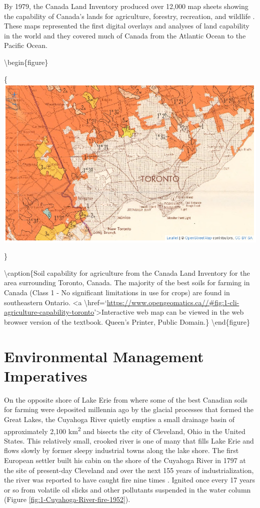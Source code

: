 \documentclass[
]{book}
\begin{document}
By 1979, the Canada Land Inventory produced over 12,000 map sheets showing the capability of Canada's lands for agriculture, forestry, recreation, and wildlife \citep{fisher_overview_1979}. These maps represented the first digital overlays and analyses of land capability in the world and they covered much of Canada from the Atlantic Ocean to the Pacific Ocean.

\textbackslash begin\{figure\}

\{\centering \includegraphics[width=1\linewidth]{images/01-cli-agriculture-capability-toronto}

\}

\textbackslash caption\{Soil capability for agriculture from the Canada Land Inventory for the area surrounding Toronto, Canada. The majority of the best soils for farming in Canada (Class 1 - No significant limitations in use for crops) are found in southeastern Ontario. \textless a
\textbackslash href=`\url{https://www.opengeomatics.ca//\#fig:1-cli-agriculture-capability-toronto}'\textgreater Interactive web map can be viewed in the web browser version of the textbook. Queen's Printer, Public Domain.\}\label{fig:1-cli-agriculture-capability-toronto}
\textbackslash end\{figure\}

\section{Environmental Management Imperatives}\label{environmental-management-imperatives}

On the opposite shore of Lake Erie from where some of the best Canadian soils for farming were deposited millennia ago by the glacial processes that formed the Great Lakes, the Cuyahoga River quietly empties a small drainage basin of approximately 2,100 km\textsuperscript{2} and bisects the city of Cleveland, Ohio in the United States. This relatively small, crooked river is one of many that fills Lake Erie and flows slowly by former sleepy industrial towns along the lake shore. The first European settler built his cabin on the shore of the Cuyahoga River in 1797 at the site of present-day Cleveland and over the next 155 years of industrialization, the river was reported to have caught fire nine times \citep{la_bella_not_2009}. Ignited once every 17 years or so from volatile oil slicks and other pollutants suspended in the water column (Figure \ref{fig:1-Cuyahoga-River-fire-1952}).
\end{document}
